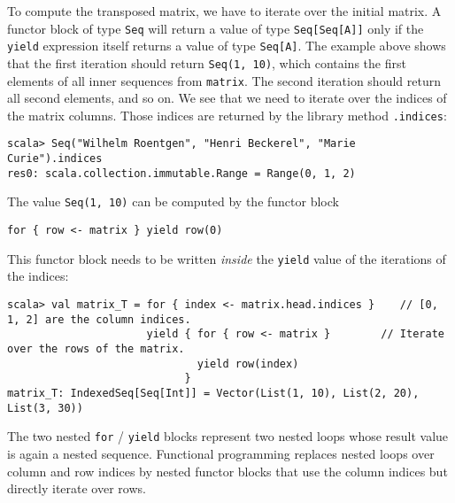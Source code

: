 \noindent To compute the transposed matrix, we have to iterate over
the initial matrix. A functor block of type \lstinline!Seq! will
return a value of type \lstinline!Seq[Seq[A]]! only if the \lstinline!yield!
expression itself returns a value of type \lstinline!Seq[A]!. The
example above shows that the first iteration should return \lstinline!Seq(1, 10)!,
which contains the first elements of all inner sequences from \lstinline!matrix!.
The second iteration should return all second elements, and so on.
We see that we need to iterate over the indices of the matrix columns.
Those indices are returned by the library method \lstinline!.indices!:
\begin{lstlisting}
scala> Seq("Wilhelm Roentgen", "Henri Beckerel", "Marie Curie").indices
res0: scala.collection.immutable.Range = Range(0, 1, 2)
\end{lstlisting}
The value \lstinline!Seq(1, 10)! can be computed by the functor block
\begin{lstlisting}
for { row <- matrix } yield row(0)
\end{lstlisting}
This functor block needs to be written \emph{inside} the \lstinline!yield!
value of the iterations of the indices:
\begin{lstlisting}
scala> val matrix_T = for { index <- matrix.head.indices }    // [0, 1, 2] are the column indices.
                      yield { for { row <- matrix }        // Iterate over the rows of the matrix.
                              yield row(index)
                            }
matrix_T: IndexedSeq[Seq[Int]] = Vector(List(1, 10), List(2, 20), List(3, 30))
\end{lstlisting}

The two nested \lstinline!for! / \lstinline!yield! blocks represent
two nested loops whose result value is again a nested sequence. Functional
programming replaces nested loops over column and row indices by nested
functor blocks that use the column indices but directly iterate over
rows.

